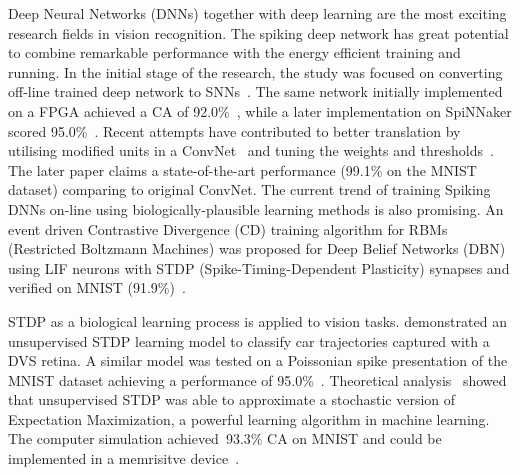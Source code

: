 \documentclass{frontiersENG} %
\begin{document}
Deep Neural Networks (DNNs) together with deep learning are the most exciting research fields in vision recognition.
The spiking deep network has great potential to combine remarkable performance with the energy efficient training and running.
In the initial stage of the research, the study was focused on converting off-line trained deep network to SNNs~\citep{o2013real}.
The same network initially implemented on a FPGA achieved a CA of 92.0\%~\citep{neil2014minitaur}, while a later implementation on SpiNNaker scored 95.0\%~\citep{Stromatias2015scalable}.
Recent attempts have contributed to better translation by utilising modified units in a ConvNet~\citep{cao2015spiking} and tuning the weights and thresholds~\citep{Diehl2015fast}.
The later paper claims a state-of-the-art performance (99.1\% on the MNIST dataset) comparing to original ConvNet.
The current trend of training Spiking DNNs on-line using biologically-plausible learning methods is also promising.
An event driven Contrastive Divergence (CD) training algorithm for RBMs (Restricted Boltzmann Machines) was proposed for Deep Belief Networks (DBN) using LIF neurons with STDP (Spike-Timing-Dependent Plasticity) synapses and verified on MNIST (91.9\%)~\citep{neftci2013event}.

STDP as a biological learning process is applied to vision tasks.
\cite{bichler2012extraction} demonstrated an unsupervised STDP learning model to classify car trajectories captured with a DVS retina. 
A similar model was tested on a Poissonian spike presentation of the MNIST dataset achieving a performance of 95.0\%~\citep{diehl2015unsupervised}.
Theoretical analysis~\citep{nessler2013bayesian} showed that unsupervised STDP was able to approximate a stochastic version of Expectation Maximization, a powerful learning algorithm in machine learning.
The computer simulation achieved~93.3\% CA on MNIST and could be implemented in a memrisitve device~\citep{bill2014compound}. 
\end{document}
